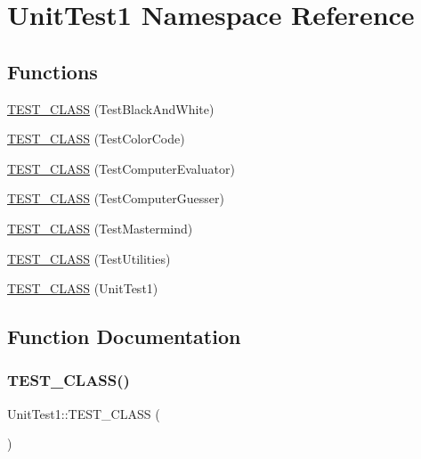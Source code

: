 \hypertarget{namespace_unit_test1}{}\section{Unit\+Test1 Namespace Reference}
\label{namespace_unit_test1}
\subsection*{Functions}
\begin{DoxyCompactItemize}
\item 
\hyperlink{namespace_unit_test1_a8e0fb85865ea4559c8e46ba685e3a05c}{T\+E\+S\+T\+\_\+\+C\+L\+A\+SS} (Test\+Black\+And\+White)
\item 
\hyperlink{namespace_unit_test1_a288b4cd11e15db4ea6d87bbba9237858}{T\+E\+S\+T\+\_\+\+C\+L\+A\+SS} (Test\+Color\+Code)
\item 
\hyperlink{namespace_unit_test1_a9de6dc6a7cd73dea67d8cc57aa018fd8}{T\+E\+S\+T\+\_\+\+C\+L\+A\+SS} (Test\+Computer\+Evaluator)
\item 
\hyperlink{namespace_unit_test1_a1591fd2592b729138d235f98f5b6b79f}{T\+E\+S\+T\+\_\+\+C\+L\+A\+SS} (Test\+Computer\+Guesser)
\item 
\hyperlink{namespace_unit_test1_a7ebc37dd289fa7eaf725d2a0e8deb453}{T\+E\+S\+T\+\_\+\+C\+L\+A\+SS} (Test\+Mastermind)
\item 
\hyperlink{namespace_unit_test1_a31d8bd76aeabc19fa0617d7a72d1d1d6}{T\+E\+S\+T\+\_\+\+C\+L\+A\+SS} (Test\+Utilities)
\item 
\hyperlink{namespace_unit_test1_a72947bdb044a2f5ee054fe1c31e79255}{T\+E\+S\+T\+\_\+\+C\+L\+A\+SS} (Unit\+Test1)
\end{DoxyCompactItemize}


\subsection{Function Documentation}
\hypertarget{namespace_unit_test1_a72947bdb044a2f5ee054fe1c31e79255}{}\label{namespace_unit_test1_a72947bdb044a2f5ee054fe1c31e79255} 
\subsubsection{\texorpdfstring{T\+E\+S\+T\+\_\+\+C\+L\+A\+S\+S()}{TEST\_CLASS()}\hspace{0.1cm}{\footnotesize\ttfamily [1/7]}}
{\footnotesize\ttfamily Unit\+Test1\+::\+T\+E\+S\+T\+\_\+\+C\+L\+A\+SS (\begin{DoxyParamCaption}\item[{Unit\+Test1}]{ }\end{DoxyParamCaption})}

